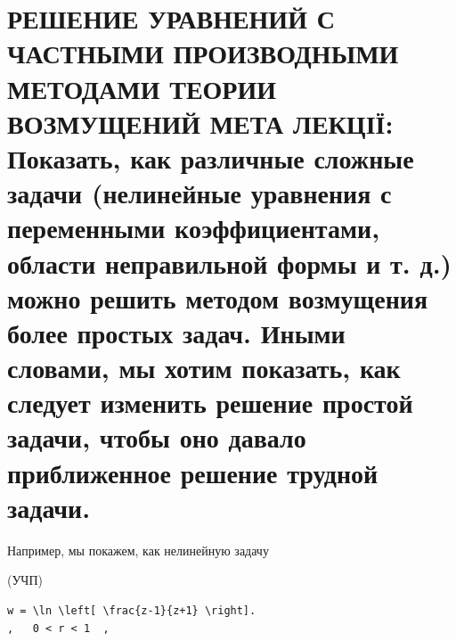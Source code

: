 \documentclass[
  ukrainian,
]{article}
\begin{document}
\section{РЕШЕНИЕ УРАВНЕНИЙ С ЧАСТНЫМИ ПРОИЗВОДНЫМИ МЕТОДАМИ ТЕОРИИ
ВОЗМУЩЕНИЙ МЕТА ЛЕКЦІЇ: Показать, как различные сложные задачи
(нелинейные уравнения с переменными коэффициентами, области неправильной
формы и т. д.) можно решить методом возмущения более простых задач.
Иными словами, мы хотим показать, как следует изменить решение простой
задачи, чтобы оно давало приближенное решение трудной
задачи.}\label{ux440ux435ux448ux435ux43dux438ux435-ux443ux440ux430ux432ux43dux435ux43dux438ux439-ux441-ux447ux430ux441ux442ux43dux44bux43cux438-ux43fux440ux43eux438ux437ux432ux43eux434ux43dux44bux43cux438-ux43cux435ux442ux43eux434ux430ux43cux438-ux442ux435ux43eux440ux438ux438-ux432ux43eux437ux43cux443ux449ux435ux43dux438ux439-ux43cux435ux442ux430-ux43bux435ux43aux446ux456ux457-ux43fux43eux43aux430ux437ux430ux442ux44c-ux43aux430ux43a-ux440ux430ux437ux43bux438ux447ux43dux44bux435-ux441ux43bux43eux436ux43dux44bux435-ux437ux430ux434ux430ux447ux438-ux43dux435ux43bux438ux43dux435ux439ux43dux44bux435-ux443ux440ux430ux432ux43dux435ux43dux438ux44f-ux441-ux43fux435ux440ux435ux43cux435ux43dux43dux44bux43cux438-ux43aux43eux44dux444ux444ux438ux446ux438ux435ux43dux442ux430ux43cux438-ux43eux431ux43bux430ux441ux442ux438-ux43dux435ux43fux440ux430ux432ux438ux43bux44cux43dux43eux439-ux444ux43eux440ux43cux44b-ux438-ux442.-ux434.-ux43cux43eux436ux43dux43e-ux440ux435ux448ux438ux442ux44c-ux43cux435ux442ux43eux434ux43eux43c-ux432ux43eux437ux43cux443ux449ux435ux43dux438ux44f-ux431ux43eux43bux435ux435-ux43fux440ux43eux441ux442ux44bux445-ux437ux430ux434ux430ux447.-ux438ux43dux44bux43cux438-ux441ux43bux43eux432ux430ux43cux438-ux43cux44b-ux445ux43eux442ux438ux43c-ux43fux43eux43aux430ux437ux430ux442ux44c-ux43aux430ux43a-ux441ux43bux435ux434ux443ux435ux442-ux438ux437ux43cux435ux43dux438ux442ux44c-ux440ux435ux448ux435ux43dux438ux435-ux43fux440ux43eux441ux442ux43eux439-ux437ux430ux434ux430ux447ux438-ux447ux442ux43eux431ux44b-ux43eux43dux43e-ux434ux430ux432ux430ux43bux43e-ux43fux440ux438ux431ux43bux438ux436ux435ux43dux43dux43eux435-ux440ux435ux448ux435ux43dux438ux435-ux442ux440ux443ux434ux43dux43eux439-ux437ux430ux434ux430ux447ux438.}

Например, мы покажем, как нелинейную задачу

(УЧП)

\begin{verbatim}
w = \ln \left[ \frac{z-1}{z+1} \right].
,   0 < r < 1  ,
\end{verbatim}
\end{document}
